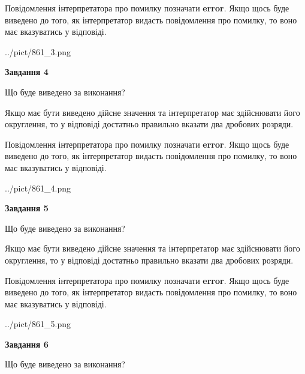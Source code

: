 \documentclass[12pt, ukrainian]{article}
\begin{document}
{\begin {Large}
Повідомлення інтерпретатора про помилку позначати \textbf{error}.
Якщо щось буде виведено до того, як інтерпретатор видасть повідомлення про помилку, 
то воно має вказуватись у відповіді. \par

\begin{center}
	{../pict/861_3.png}
\end{center}
\newpage

{\begin {center}\textbf{Завдання 4}\end {center}}\par
Що буде виведено за виконання? \par

Якщо має бути виведено дійсне значення та інтерпретатор має здійснювати його округлення, 
то у відповіді достатньо правильно вказати два дробових розряди.

Повідомлення інтерпретатора про помилку позначати \textbf{error}.
Якщо щось буде виведено до того, як інтерпретатор видасть повідомлення про помилку, 
то воно має вказуватись у відповіді. \par

\begin{center}
	{../pict/861_4.png}
\end{center}
\newpage

{\begin {center}\textbf{Завдання 5}\end {center}}\par
Що буде виведено за виконання? \par

Якщо має бути виведено дійсне значення та інтерпретатор має здійснювати його округлення, 
то у відповіді достатньо правильно вказати два дробових розряди.

Повідомлення інтерпретатора про помилку позначати \textbf{error}.
Якщо щось буде виведено до того, як інтерпретатор видасть повідомлення про помилку, 
то воно має вказуватись у відповіді. \par

\begin{center}
	{../pict/861_5.png}
\end{center}
\newpage

{\begin {center}\textbf{Завдання 6}\end {center}}\par
Що буде виведено за виконання? \par


\end{Large}}
\end{document}
